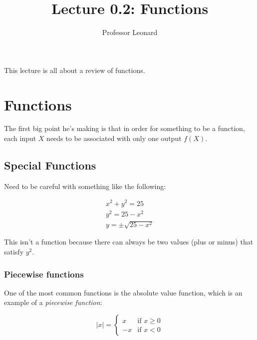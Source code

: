 \documentclass{article}
\begin{document}
\title{Lecture 0.2: Functions}
\author{Professor Leonard}
\maketitle

This lecture is all about a review of functions.


\section{Functions}
The first big point he's making is that in order for something to be a function, each
input $X$ needs to be associated with only one output $f(X)$.

\subsection{Special Functions}

Need to be careful with something like the following:

\begin{align}
    x^2 + y^2 = 25\\
    y^2 = 25 - x^2\\
    y = \pm \sqrt{25 - x^2}
\end{align}

This isn't a function because there can always be two values (plus or minus) that satisfy
$y^2$.\\

\subsubsection{Piecewise functions}

One of the most common functions is the absolute value function, which is an example of a
\emph{piecewise function}:

\begin{equation}
    \lvert x \rvert = 
    \begin{cases}
        x & \text{if } x \geq 0\\
        -x & \text{if } x < 0
    \end{cases}
\end{equation}
\end{document}
